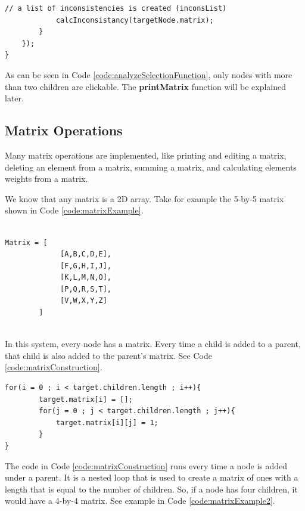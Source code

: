 \documentclass[11pt]{article} %
\begin{document}
\begin{itemize}
\begin{minipage}[c]{\linewidth}
\begin{lstlisting}[basicstyle=\scriptsize, tabsize=4, frame=single, caption=analyzeSelectionFunction function, label=code:analyzeSelectionFunction]
			// a list of inconsistencies is created (inconsList)
			calcInconsistancy(targetNode.matrix); 
		}
	});	
}
\end{lstlisting}
\end{minipage}
\noindent
As can be seen in Code \ref{code:analyzeSelectionFunction}, only nodes with more than two children are clickable. The \textbf{printMatrix} function will be explained later.
\end{itemize}

\subsection{Matrix Operations}
Many matrix operations are implemented, like printing and editing a matrix, deleting an element from a matrix, summing a matrix, and calculating elements weights from a matrix.

\noindent
We know that any matrix is a 2D array. Take for example the 5-by-5 matrix shown in Code \ref{code:matrixExample}. 


\noindent
\begin{minipage}[c]{\linewidth}
\begin{lstlisting}[basicstyle=\scriptsize, tabsize=4, frame=single, caption=Matrix Example, label=code:matrixExample]

Matrix = [
			 [A,B,C,D,E],
			 [F,G,H,I,J],
			 [K,L,M,N,O],
			 [P,Q,R,S,T],
			 [V,W,X,Y,Z]
		]

\end{lstlisting}
\end{minipage}
\\[6pt]

\noindent
In this system, every node has a matrix. Every time a child is added to a parent, that child is also added to the parent's matrix. See Code \ref{code:matrixConstruction}.

\noindent
\begin{minipage}[c]{\linewidth}
\begin{lstlisting}[basicstyle=\scriptsize, tabsize=4, frame=single, caption=Matrix construction, label=code:matrixConstruction]
for(i = 0 ; i < target.children.length ; i++){
		target.matrix[i] = [];
		for(j = 0 ; j < target.children.length ; j++){
			target.matrix[i][j] = 1;
		}
}
\end{lstlisting}
\end{minipage}

\noindent
The code in Code \ref{code:matrixConstruction} runs every time a node is added under a parent. It is a nested loop that is used to create a matrix of ones with a length that is equal to the number of children. So, if a node has four children, it would have a 4-by-4 matrix. See example in Code \ref{code:matrixExample2}.
\end{document}
